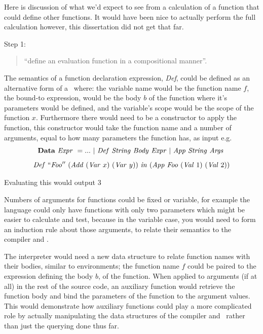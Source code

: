 \documentclass {article}
\begin{document}
Here is discussion of what we'd expect to see from a
calculation of a function
that could define other functions. It would have been
nice to actually perform the full calculation however, this 
dissertation did not get that far.

Step 1: 
\begin{quote}
``define an evaluation function in a compositional manner''.
\end{quote}

\newcommand{\deef}{\textit{Def}}
\newcommand{\DEFt}{\textit{DEF}}
\newcommand{\Deef}{\mathit{Def\ }}
\newcommand{\DEF}{\mathit{DEF\ }}
\newcommand{\body}{\textit{Body}}
\newcommand{\Body}{\mathit{Body}}
\newcommand{\app}{\textit{App}}
\newcommand{\APPt}{\textit{APP}}
\newcommand{\App}{\mathit{App\ }}
\newcommand{\APP}{\mathit{APP\ }}
\newcommand{\Args}{\mathit{Args\ }}

The semantics of a function
declaration expression, \deef, 
could be defined as an alternative form of a \leet\
where: the variable name would be the function name $f$,
the bound-to expression, would be the body $b$ of the function
where it's parameters would be defined, 
and the variable's scope would be the scope of the function $x$.
Furthermore there would need to be a constructor to apply the function,
this constructor would take the function name and a number of
arguments, equal to how many parameters the function has, as input e.g.
\begin{equation*}
\mathbf{Data}\ \Expr = ...\ |\ \Deef  \String  \Body\  \Expr |\ 
				\App \String \Args
\end{equation*}
\[ \Deef \mathit{``Foo''\ } 
		(\Add (\Var x)\ (\Var y))\
		\mathit{in}\ (\mathit{App\ Foo\ } (\Val 1)\ (\Val 2))\]

\noindent Evaluating this would output 3

Numbers of arguments for functions could be fixed or variable, 
for example
the language could only have functions with only two parameters
which might be easier to calculate and test, because in the
variable case, you would
need to form an induction rule about those arguments, to relate
their semantics to the compiler and \vm\cite[\S5]{bandh}.

The interpreter would need a new data structure to 
relate function names with their bodies,
similar to environments;
the function name $f$ could be paired to
the expression defining the body $b$, of the function.
When applied 
to arguments (if at all) in the rest of the source code, 
an auxiliary function would retrieve the function
body and bind the parameters of the function to
the argument values.
This would demonstrate how 
auxiliary functions could play a more complicated role 
by actually manipulating the data structures of the compiler and \vm\
rather than just the querying done thus far.
\end{document}
